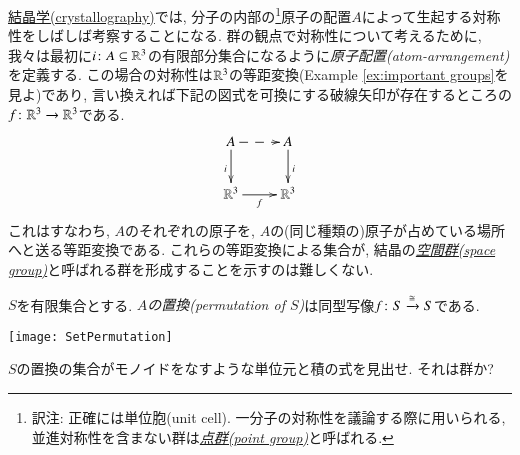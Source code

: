 \begin{application}\label{app:groups for symmetry}


\href{http://en.wikipedia.org/wiki/Crystallography}{結晶学(crystallography)}では, 分子の内部の\footnote{訳注: 正確には単位胞(unit cell). 一分子の対称性を議論する際に用いられる, 並進対称性を含まない群は\href{http://en.wikipedia.org/wiki/Point_group}{\emph{点群(point group)}}と呼ばれる.}原子の配置$A$によって生起する対称性をしばしば考察することになる. 群の観点で対称性について考えるために, 我々は最初に$i\colon A\subseteq{\mathbb R}^3$の有限部分集合になるように\emph{原子配置(atom-arrangement)}を定義する. この場合の対称性は${\mathbb R}^3$の等距変換(Example \ref{ex:important groups}を見よ)であり, 言い換えれば下記の図式を可換にする破線矢印が存在するところの$f\colon{\mathbb R}^3\rightarrow{\mathbb R}^3$である. 
$$
\xymatrix{A\ar@{-->}[r]\ar[d]_i&A\ar[d]^i\\\RR^3\ar[r]_f&\RR^3}
$$
これはすなわち, $A$のそれぞれの原子を, $A$の(同じ種類の)原子が占めている場所へと送る等距変換である. これらの等距変換による集合が, 結晶の\href{http://en.wikipedia.org/wiki/Space_group}{\emph{空間群(space group)}}と呼ばれる群を形成することを示すのは難しくない.
\end{application}

\begin{exercise}\label{exc:permutation}
$S$を有限集合とする. \emph{$A$の置換(permutation of $S$)}は同型写像$f\colon S\xrightarrow{\cong}S$である.
\begin{center}
\parbox{2.3in}{
\texttt{[image: SetPermutation]}}
\end{center}
\sexc $S$の置換の集合がモノイドをなすような単位元と積の式を見出せ.
\next それは群か?
\endsexc
\end{exercise}

